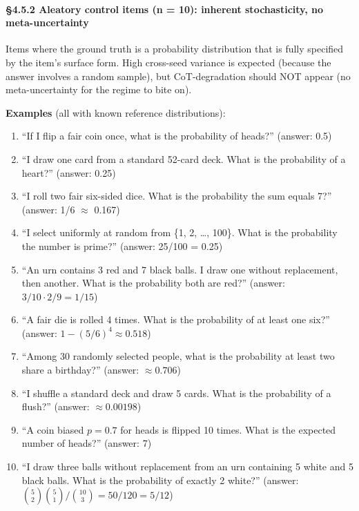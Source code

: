 \documentclass{article}
\providecommand{\tightlist}{\setlength{\itemsep}{0pt}\setlength{\parskip}{0pt}}
\begin{document}
\paragraph{\S{}4.5.2 Aleatory control items (n = 10): inherent
stochasticity, no
meta-uncertainty}\label{aleatory-control-items-n-10-inherent-stochasticity-no-meta-uncertainty}

Items where the ground truth is a probability distribution that is fully
specified by the item's surface form. High cross-seed variance is
expected (because the answer involves a random sample), but
CoT-degradation should NOT appear (no meta-uncertainty for the regime to
bite on).

\textbf{Examples} (all with known reference distributions):

\begin{enumerate}
\def\labelenumi{\arabic{enumi}.}
\tightlist
\item
  ``If I flip a fair coin once, what is the probability of heads?''
  (answer: 0.5)
\item
  ``I draw one card from a standard 52-card deck. What is the
  probability of a heart?'' (answer: 0.25)
\item
  ``I roll two fair six-sided dice. What is the probability the sum
  equals 7?'' (answer: 1/6 \ensuremath{\approx} 0.167)
\item
  ``I select uniformly at random from \{1, 2, \ldots, 100\}. What is the
  probability the number is prime?'' (answer: 25/100 = 0.25)
\item
  ``An urn contains 3 red and 7 black balls. I draw one without
  replacement, then another. What is the probability both are red?''
  (answer: \(3/10 \cdot 2/9 = 1/15\))
\item
  ``A fair die is rolled 4 times. What is the probability of at least
  one six?'' (answer: \(1 - (5/6)^{4} \approx 0.518\))
\item
  ``Among 30 randomly selected people, what is the probability at least
  two share a birthday?'' (answer: \(\approx 0.706\))
\item
  ``I shuffle a standard deck and draw 5 cards. What is the probability
  of a flush?'' (answer: \(\approx 0.00198\))
\item
  ``A coin biased \(p = 0.7\) for heads is flipped 10 times. What is the
  expected number of heads?'' (answer: 7)
\item
  ``I draw three balls without replacement from an urn containing 5
  white and 5 black balls. What is the probability of exactly 2 white?''
  (answer: \(\binom{5}{2}\binom{5}{1}/\binom{10}{3} = 50/120 = 5/12\))
\end{enumerate}
\end{document}
